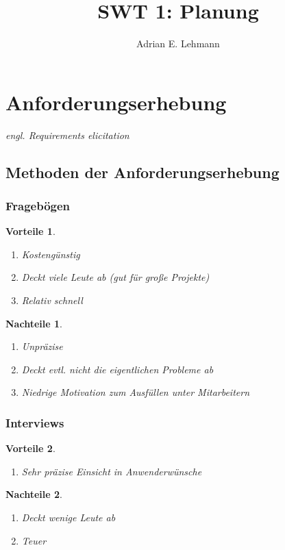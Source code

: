 \documentclass[a4paper]{article}
\title{SWT 1: Planung}
\author{Adrian E. Lehmann}
\theoremstyle{break}
\newtheorem{why}{Vorteile}[section]
\newtheorem{whynot}{Nachteile}[section]
\begin{document}
	\maketitle
	\tableofcontents
	\newpage


\section{Anforderungserhebung}
	\textit{engl. Requirements elicitation}
\subsection{Methoden der Anforderungserhebung}	
\subsubsection{Fragebögen}
	\begin{why}
		\begin{enumerate}
			\item Kostengünstig
			\item Deckt viele Leute ab (gut für große Projekte)
			\item Relativ schnell
		\end{enumerate}
	\end{why}
	\begin{whynot}
		\begin{enumerate}
			\item Unpräzise
			\item Deckt evtl. nicht die eigentlichen Probleme ab
			\item Niedrige Motivation zum Ausfüllen unter Mitarbeitern
		\end{enumerate}
	\end{whynot}
\subsubsection{Interviews}
	\begin{why}
		\begin{enumerate}
			\item Sehr präzise Einsicht in Anwenderwünsche
		\end{enumerate}
	\end{why}
	\begin{whynot}
		\begin{enumerate}
			\item Deckt wenige Leute ab
			\item Teuer
			\end{enumerate}
	\end{whynot}
\end{document}
